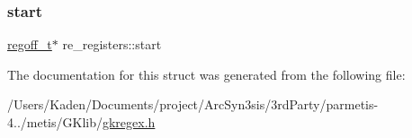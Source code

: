 \mbox{\label{a00690_a6676ddb6ab07e50191e149b04dbcfe03}} 
\subsubsection{\texorpdfstring{start}{start}}
{\footnotesize\ttfamily \hyperlink{a00092_a5b34995b47432512ee4ffa32b836e65f}{regoff\+\_\+t}$\ast$ re\+\_\+registers\+::start}



The documentation for this struct was generated from the following file\+:\begin{DoxyCompactItemize}
\item 
/\+Users/\+Kaden/\+Documents/project/\+Arc\+Syn3sis/3rd\+Party/parmetis-\/4../metis/\+G\+Klib/\hyperlink{a00092}{gkregex.\+h}\end{DoxyCompactItemize}
